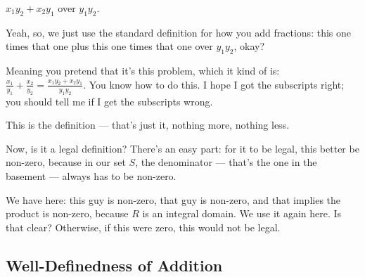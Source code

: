 \begin{student}
$x_1 y_2 + x_2 y_1$ over $y_1 y_2$.
\end{student}

\begin{speech}[00:58:39 - 01:00:40]
Yeah, so, we just use the standard definition for how you add fractions: this one times that one plus this one times that one over $y_1 y_2$, okay? 

Meaning you pretend that it's this problem, which it kind of is:  $\frac{x_1}{y_1} + \frac{x_2}{y_2} = \frac{x_1 y_2 + x_2 y_1}{y_1 y_2}$. You know how to do this. I hope I got the subscripts right; you should tell me if I get the subscripts wrong.

This is the definition --- that's just it, nothing more, nothing less.

Now, is it a legal definition? There's an easy part: for it to be legal, this better be non-zero,  because in our set $S$, the denominator --- that's the one in the basement --- always has to be non-zero.

We have here: this guy is non-zero, that guy is non-zero, and that implies the product is non-zero, because $R$ is an integral domain.  We use it again here. Is that clear? Otherwise, if this were zero, this would not be legal.
\end{speech}

\subsection{Well-Definedness of Addition}

